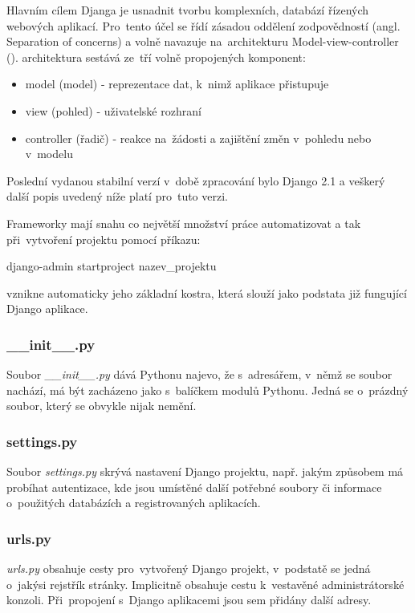 Hlavním cílem Djanga je usnadnit tvorbu komplexních, databází řízených
webových aplikací. Pro~tento účel se řídí zásadou oddělení
zodpovědností (angl. Separation of concerns) a volně navazuje na~architekturu 
Model-view-controller (). \cite{definitiveguide} 
\newpage
{} architektura sestává ze~tří volně propojených komponent:
\begin{itemize}
\item model (model) - reprezentace dat, k~nimž aplikace přistupuje
\item view (pohled) - uživatelské rozhraní
\item controller (řadič) - reakce na~žádosti a zajištění změn v~pohledu nebo v~modelu
\end{itemize}

Poslední vydanou stabilní verzí v~době zpracování bylo Django 2.1 a
veškerý další popis uvedený níže platí pro~tuto verzi.

Frameworky mají snahu co největší množství práce automatizovat a tak
při~vytvo\-ření projektu pomocí příkazu:

\begin{center}
\textsf{django-admin startproject nazev\_projektu}
\end{center}

vznikne automaticky jeho základní kostra, která slouží jako podstata
již fungující Django aplikace. \cite{django-doc}


\subsubsection{\_\_init\_\_.py}
Soubor \textit{\_\_init\_\_.py} dává Pythonu najevo, že s~adresářem, v~němž 
se soubor nachází, má být zacházeno jako s~balíčkem modulů
Pythonu. Jedná se o~prázdný soubor, který se obvykle nijak nemění.

\subsubsection{settings.py}
\label{settings}
Soubor \textit{settings.py} skrývá nastavení Django projektu,
např. jakým způsobem má probíhat autentizace, kde jsou umístěné další
potřebné soubory či informace o~použi\-tých databázích a registrovaných
aplikacích.

\subsubsection{urls.py}
\textit{urls.py} obsahuje  cesty pro~vytvořený Django projekt,
v~podstatě se jedná o~jakýsi rejstřík stránky. Implicitně obsahuje
cestu k~vestavěné administrátorské konzoli. Při~propojení s~Django
aplikacemi jsou sem přidány další  adresy.

